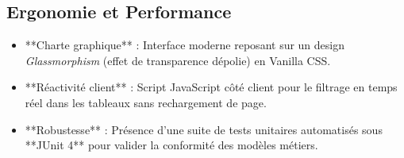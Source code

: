\documentclass[12pt,a4paper]{article}
\begin{document}
\subsection{Ergonomie et Performance}
\begin{itemize}
    \item **Charte graphique** : Interface moderne reposant sur un design \textit{Glassmorphism} (effet de transparence dépolie) en Vanilla CSS.
    \item **Réactivité client** : Script JavaScript côté client pour le filtrage en temps réel dans les tableaux sans rechargement de page.
    \item **Robustesse** : Présence d'une suite de tests unitaires automatisés sous **JUnit 4** pour valider la conformité des modèles métiers.
\end{itemize}
\end{document}
